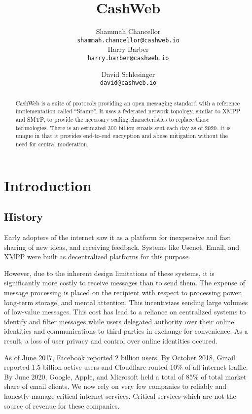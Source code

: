 \documentclass{article}
\title{CashWeb}
\author{
  Shammah Chancellor \\
  \texttt{shammah.chancellor@cashweb.io} \\
  \AND
  Harry Barber \\
  \texttt{harry.barber@cashweb.io} \\
  \and
  David Schlesinger \\
  \texttt{david@cashweb.io} \\
}
\begin{document}
\maketitle

\begin{abstract}
CashWeb is a suite of protocols providing an open messaging standard with a reference implementation called ``Stamp''. It uses a federated network topology, similar to XMPP and SMTP, to provide the necessary scaling characteristics to replace those technologies. There is an estimated 300 billion emails sent each day as of 2020\cite{emailssent2020}. It is unique in that it provides end-to-end encryption and abuse mitigation without the need for central moderation.
\end{abstract}

\section{Introduction}

\subsection{History}

Early adopters of the internet saw it as a platform for inexpensive and fast sharing of new ideas, and receiving feedback. Systems like Usenet\cite{rfc5536}\cite{rfc5537}, Email\cite{rfc5322}\cite{rfc1939}\cite{rfc5321}\cite{rfc4551}, and XMPP\cite{rfc3920}\cite{rfc3921}\cite{rfc3922}\cite{rfc3923} were built as decentralized platforms for this purpose.

However, due to the inherent design limitations of these systems, it is significantly more costly to receive messages than to send them. The expense of message processing is placed on the recipient with respect to processing power, long-term storage, and mental attention. This incentivizes sending large volumes of low-value messages. This cost has lead to a reliance on centralized systems to identify and filter messages while users delegated authority over their online identities and communications to third parties in exchange for convenience. As a result, a loss of user privacy and control over online identities occured.

As of June 2017, Facebook reported 2 billion users. By October 2018, Gmail reported 1.5 billion active users\cite{gmail2018} and Cloudflare routed 10\% of all internet traffic\cite{cloudflare2018}. By June 2020, Google, Apple, and Microsoft held a total of 85\% of total market share of email clients\cite{emailshare2020}. We now rely on very few companies to reliably and honestly manage critical internet services. Critical services which are not the source of revenue for these companies.
\end{document}
